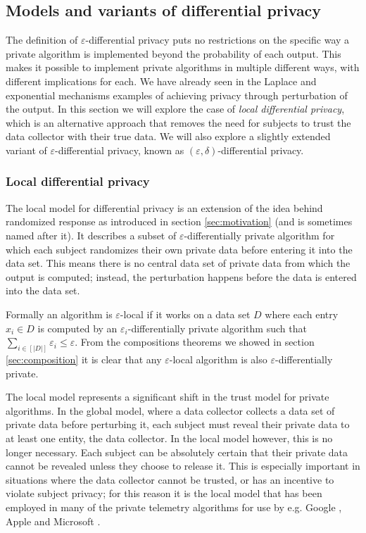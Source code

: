 \documentclass[12pt]{article}
\renewcommand{\epsilon}{\varepsilon}
\begin{document}
\subsection{Models and variants of differential privacy \label{sec:variants}}

The definition of $\epsilon$-differential privacy puts no restrictions on the specific way a private algorithm is implemented beyond the probability of each output. This makes it possible to implement private algorithms in multiple different ways, with different implications for each. We have already seen in the Laplace and exponential mechanisms examples of achieving privacy through perturbation of the output. In this section we will explore the case of \emph{local differential privacy}, which is an alternative approach that removes the need for subjects to trust the data collector with their true data. We will also explore a slightly extended variant of $\epsilon$-differential privacy, known as $(\epsilon,\delta)$-differential privacy.

\subsubsection{Local differential privacy}

The local model for differential privacy \cite{kasiv_localdiff} is an extension of the idea behind randomized response as introduced in section \ref{sec:motivation} (and is sometimes named after it). It describes a subset of $\epsilon$-differentially private algorithm for which each subject randomizes their own private data before entering it into the data set. This means there is no central data set of private data from which the output is computed; instead, the perturbation happens before the data is entered into the data set.

Formally an algorithm is $\epsilon$-local if it works on a data set $D$ where each entry $x_i \in D$ is computed by an $\epsilon_i$-differentially private algorithm such that $\sum_{i\in\left[|D|\right]} \epsilon_i \leq \epsilon$. From the compositions theorems we showed in section \ref{sec:composition} it is clear that any $\epsilon$-local algorithm is also $\epsilon$-differentially private.

The local model represents a significant shift in the trust model for private algorithms. In the global model, where a data collector collects a data set of private data before perturbing it, each subject must reveal their private data to at least one entity, the data collector. In the local model however, this is no longer necessary. Each subject can be absolutely certain that their private data cannot be revealed unless they choose to release it. This is especially important in situations where the data collector cannot be trusted, or has an incentive to violate subject privacy; for this reason it is the local model that has been employed in many of the private telemetry algorithms for use by e.g. Google \cite{google_rappor}, Apple \cite{apple_differential} and Microsoft \cite{microsoft_telemetry}.
\end{document}
